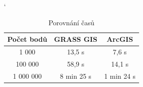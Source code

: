 \documentclass[12pt,a4paper]{article}
\begin{document}
{%

\bigskip
\begin{table}[h]
\catcode`
\begin{tabular}{|c|c|c|}
\hline
Počet bodů & GRASS GIS  & ArcGIS     \\ \hline
1 000       & 13,5 s     & 7,6 s      \\ \hline
100 000     & 58,9 s     & 14,1 s     \\ \hline
1 000 000    & 8 min 25 s & 1 min 24 s \\ \hline
\end{tabular}
\caption{Porovnání časů}
\label{tab:GRASSxArc}
\end{table}

\newpage
\begin{figure}[h!]
\centering
\begin{floatrow}
\end{floatrow}
\end{figure}

}
\end{document}
